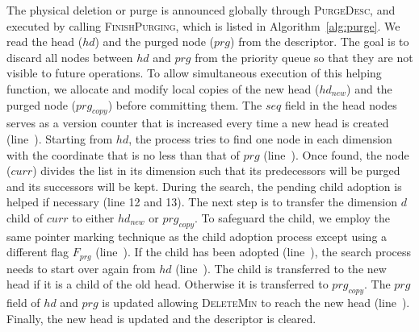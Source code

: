 \documentclass[10pt,journal,letterpaper,compsoc]{IEEEtran}
\begin{document}
The physical deletion or purge is announced globally through \textsc{PurgeDesc}, and executed by calling \textsc{FinishPurging}, which is listed in Algorithm~\ref{alg:purge}. 
We read the head ($hd$) and the purged node ($prg$) from the descriptor.
The goal is to discard all nodes between $hd$ and $prg$ from the priority queue so that they are not visible to future operations.
To allow simultaneous execution of this helping function, we allocate and modify local copies of the new head ($hd_{new}$) and the purged node ($prg_{copy}$) before committing them.
The $seq$ field in the head nodes serves as a version counter that is increased every time a new head is created (line~).
Starting from $hd$, the process tries to find one node in each dimension with the coordinate that is no less than that of $prg$ (line~).
Once found, the node ($curr$) divides the list in its dimension such that its predecessors will be purged and its successors will be kept.
During the search, the pending child adoption is helped if necessary (line 12 and 13).
The next step is to transfer the dimension $d$ child of $curr$ to either $hd_{new}$ or $prg_{copy}$.
To safeguard the child, we employ the same pointer marking technique as the child adoption process except using a different flag $F_{prg}$ (line~).
If the child has been adopted (line~), the search process needs to start over again from $hd$ (line~).
The child is transferred to the new head if it is a child of the old head.
Otherwise it is transferred to $prg_{copy}$.
The $prg$ field of $hd$ and $prg$ is updated allowing \textsc{DeleteMin} to reach the new head (line~).
Finally, the new head is updated and the descriptor is cleared.
\end{document}
